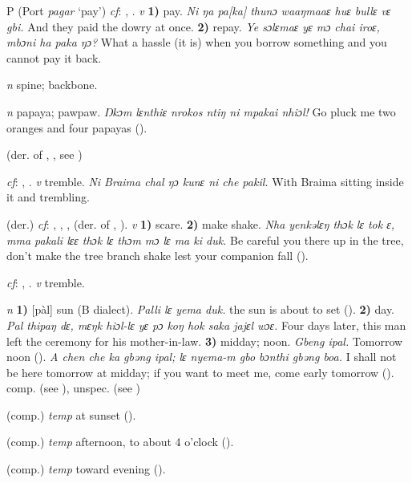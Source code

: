 \begin{letter}{P}
 (Port \textit{pagar} ‘pay') \textit{cf}: , . \textit{v} \textbf{1)} pay. \textit{Ni ŋa pa[ka] thunɔ waaŋmaaɛ huɛ bullɛ vɛ gbi.} And they paid the dowry at once. \textbf{2)} repay. \textit{Ye sɔlɛmaɛ yɛ mɔ chai iroɛ, mbɔni ha paka ŋɔ?} What a hassle (it is) when you borrow something and you cannot pay it back.

 \textit{n} spine; backbone.

 \textit{n} papaya; pawpaw. \textit{Ŋkɔm lɛnthiɛ nrokos ntiŋ ni mpakai nhiɔl!} Go pluck me two oranges and four papayas (\citealt{Pichl1967}).

 (der. of , , see ) 

 \textit{cf}: , . \textit{v} tremble. \textit{Ni Braima chal ŋɔ kunɛ ni che pakil.} With Braima sitting inside it and trembling.

 (der.) \textit{cf}: , , ,  (der. of , ). \textit{v} \textbf{1)} scare. \textbf{2)} make shake. \textit{Nha yenkəlɛŋ thɔk lɛ tok ɛ, mma pakali lɛɛ thɔk lɛ thɔm mɔ lɛ ma ki duk.} Be careful you there up in the tree, don't make the tree branch shake lest your companion fall (\citealt{Pichl1967}). 

 \textit{cf}: , . \textit{v} tremble.

 \textit{n} \textbf{1)} [pàl] sun (B dialect). \textit{Palli lɛ yema duk.} the sun is about to set (\citealt{Pichl1967}). \textbf{2)} day. \textit{Pal thipaŋ dɛ, mɛŋk hiɔl-lɛ yɛ pɔ koŋ hok saka jajɛl wɔɛ.} Four days later, this man left the ceremony for his mother-in-law. \textbf{3)} midday; noon. \textit{Gbeng ipal.} Tomorrow noon (\citealt{Pichl1967}). \textit{A chen che ka gbəng ipal; lɛ nyema-m gbo bɔnthi gbəng boa.} I shall not be here tomorrow at midday; if you want to meet me, come early tomorrow (\citealt{Pichl1967}). comp.  (see ), unspec.  (see ) 

 (comp.) \textit{temp} at sunset (\citealt{Pichl1967}).

 (comp.) \textit{temp} afternoon, to about 4 o'clock (\citealt{Pichl1967}). 

 (comp.) \textit{temp} toward evening (\citealt{Pichl1967}).


\end{letter}
